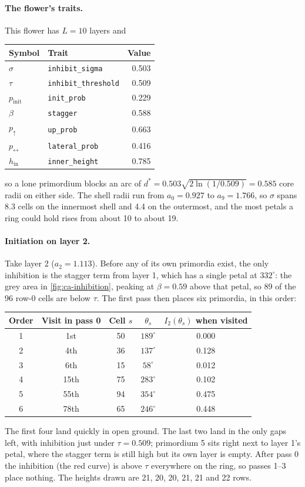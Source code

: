 \paragraph{The flower's traits.} This flower has $L = 10$ layers and
\begin{center}\small
\begin{tabular}{@{}llr@{}}
\toprule
Symbol & Trait & Value \\
\midrule
$\sigma$ & \texttt{inhibit\_sigma} & 0.503 \\
$\tau$ & \texttt{inhibit\_threshold} & 0.509 \\
$p_{\mathrm{init}}$ & \texttt{init\_prob} & 0.229 \\
$\beta$ & \texttt{stagger} & 0.588 \\
$p_\uparrow$ & \texttt{up\_prob} & 0.663 \\
$p_\leftrightarrow$ & \texttt{lateral\_prob} & 0.416 \\
$h_{\mathrm{in}}$ & \texttt{inner\_height} & 0.785 \\
\bottomrule
\end{tabular}
\end{center}
so a lone primordium blocks an arc of $d^* = 0.503\sqrt{2\ln(1/0.509)} = 0.585$
core radii on either side. The shell radii run from $a_0 = 0.927$ to $a_9 =
1.766$, so $\sigma$ spans 8.3 cells on the innermost shell and 4.4 on the
outermost, and the most petals a ring could hold rises from about 10 to about
19.

\paragraph{Initiation on layer 2.} Take layer 2 ($a_2 = 1.113$). Before any
of its own primordia exist, the only inhibition is the stagger term from
layer 1, which has a single petal at $332^\circ$: the grey area in
\cref{fig:ca-inhibition}, peaking at $\beta = 0.59$ above that petal, so 89 of
the 96 row-0 cells are below $\tau$. The first pass then places six
primordia, in this order:
\begin{center}\small
\begin{tabular}{@{}ccccc@{}}
\toprule
Order & Visit in pass 0 & Cell $s$ & $\theta_s$ & $I_2(\theta_s)$ when visited \\
\midrule
1 & 1st & 50 & $189^\circ$ & 0.000 \\
2 & 4th & 36 & $137^\circ$ & 0.128 \\
3 & 6th & 15 & $58^\circ$ & 0.012 \\
4 & 15th & 75 & $283^\circ$ & 0.102 \\
5 & 55th & 94 & $354^\circ$ & 0.475 \\
6 & 78th & 65 & $246^\circ$ & 0.448 \\
\bottomrule
\end{tabular}
\end{center}
The first four land quickly in open ground. The last two land in the only
gaps left, with inhibition just under $\tau = 0.509$; primordium 5 sits right
next to layer 1's petal, where the stagger term is still high but its own
layer is empty. After pass 0 the inhibition (the red curve) is above $\tau$
everywhere on the ring, so passes 1--3 place nothing. The heights drawn are
21, 20, 20, 21, 21 and 22 rows.

